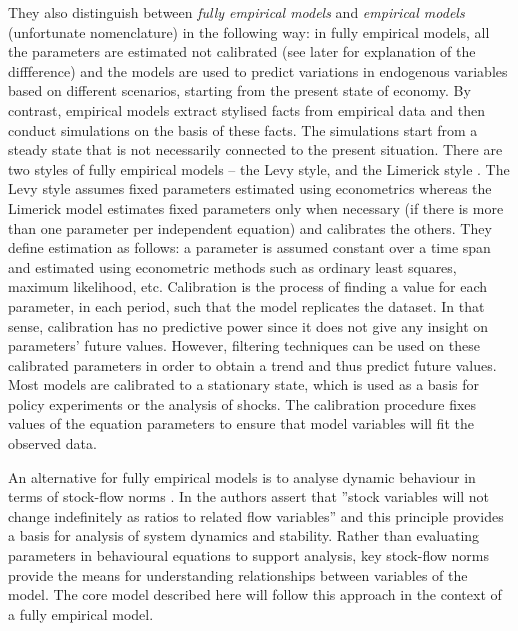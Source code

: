\documentclass[twoside,a4paper,11pt]{article}
\begin{document}
They also distinguish between \emph{fully empirical models} and \emph{empirical models} (unfortunate nomenclature) in the following way: in fully empirical models, all the parameters are estimated not calibrated (see later for explanation of the diffference) and the models are used to predict variations in endogenous variables based on different scenarios, starting from the present state of economy. By contrast, empirical models extract stylised facts from empirical data and then conduct simulations on the basis of these facts. The simulations start from a steady state that is not necessarily connected to the present situation. There are two styles of fully empirical models -- the Levy style, and the Limerick style \cite{Kinsella2012b}. The Levy style assumes fixed parameters estimated using econometrics whereas the Limerick model estimates fixed parameters only when necessary (if there is more than one parameter per independent equation) and calibrates the others. They define estimation as follows: a parameter is assumed constant over a time span and estimated using econometric methods such as ordinary least squares, maximum likelihood, etc. Calibration is the process of finding a value for each parameter, in each period, such that the model replicates the dataset. In that sense, calibration has no predictive power since it does not give any insight on parameters’ future values. However, filtering techniques can be used on these calibrated parameters in order to obtain a trend and thus predict future values. Most models are calibrated to a stationary state, which is used as a basis for policy experiments or the analysis of shocks.  The calibration procedure fixes values of the equation parameters  to ensure that model variables will fit the observed data.

An alternative for fully empirical models is to analyse dynamic behaviour in terms of stock-flow norms \cite{Godley1999b}. In \cite[p42]{Godley1983} the authors assert that ''stock variables will not change indefinitely as ratios to related flow variables'' and this principle provides a basis for analysis of system dynamics and stability. Rather than evaluating parameters in behavioural equations to support analysis, key stock-flow norms provide the means for understanding relationships between variables of the model.  The core model described here will follow this approach in the context of a fully empirical model.
\end{document}
